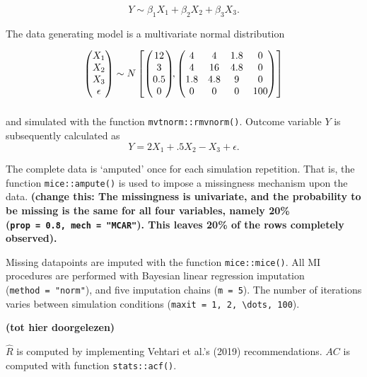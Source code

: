 \documentclass[
  Royal, times, sageapa]{sagej}
\begin{document}
\[Y \sim \beta_1 X_1 + \beta_2 X_2 + \beta_3 X_3.\]

The data generating model is a multivariate normal distribution

\begin{align*}
\begin{pmatrix}X_1\\
X_2\\
X_3\\
\epsilon
\end{pmatrix} \sim  N
\begin{bmatrix}
\begin{pmatrix}
12\\
3\\
0.5\\
0
\end{pmatrix}\!\!,
\begin{pmatrix}
4 & 4 & 1.8 & 0\\
4 & 16 & 4.8 & 0\\
1.8 & 4.8 & 9 & 0\\
0 & 0 & 0 & 100
\end{pmatrix}
\end{bmatrix}\\[2\jot]
\end{align*}

and simulated with the function \texttt{mvtnorm::rmvnorm()}. Outcome
variable \(Y\) is subsequently calculated as
\[Y =  2X_1 + .5X_2 - X_3 + \epsilon .\]

The complete data is `amputed' once for each simulation repetition. That
is, the function \texttt{mice::ampute()} is used to impose a missingness
mechanism upon the data. \textbf{(change this: The missingness is
univariate, and the probability to be missing is the same for all four
variables, namely 20\% (\texttt{prop\ =\ 0.8,\ mech\ =\ "MCAR"}). This
leaves 20\% of the rows completely observed). }

Missing datapoints are imputed with the function \texttt{mice::mice()}.
All MI procedures are performed with Bayesian linear regression
imputation (\texttt{method\ =\ "norm"}), and five imputation chains
(\texttt{m\ =\ 5}). The number of iterations varies between simulation
conditions (\texttt{maxit\ =\ 1,\ 2,\ \textbackslash{}dots,\ 100}).

\textbf{(tot hier doorgelezen)}

\(\widehat{R}\) is computed by implementing Vehtari et al.'s (2019)
recommendations. \(AC\) is computed with function \texttt{stats::acf()}.
\end{document}
